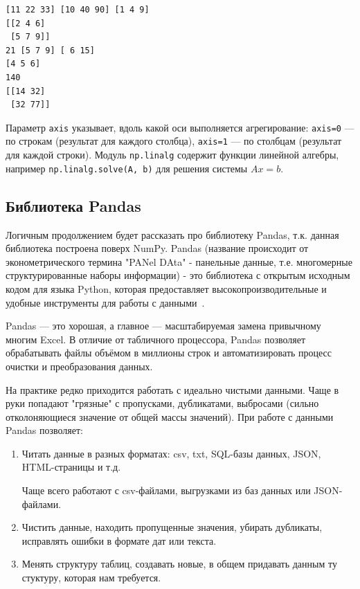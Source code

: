 \documentclass[pract]{SCWorks}
\begin{document}
\begin{verbatim}
[11 22 33] [10 40 90] [1 4 9]
[[2 4 6]
 [5 7 9]]
21 [5 7 9] [ 6 15]
[4 5 6]
140
[[14 32]
 [32 77]]
\end{verbatim}

Параметр \texttt{axis} указывает, вдоль какой оси выполняется агрегирование: \texttt{axis=0} --- по строкам
(результат для каждого столбца), \texttt{axis=1} --- по столбцам (результат для каждой строки).
Модуль \texttt{np.linalg} содержит функции линейной алгебры, например \texttt{np.linalg.solve(A, b)} для решения
системы \(Ax = b\).

\subsection{Библиотека Pandas}

Логичным продолжением будет рассказать про библиотеку Pandas, т.к. данная библиотека построена поверх NumPy. 
Pandas (название происходит от эконометрического термина "PANel DAta" - панельные данные, т.е. многомерные 
структурированные наборы информации) - это библиотека с открытым исходным кодом для языка Python, 
которая предоставляет высокопроизводительные и удобные инструменты для работы с данными~\cite{pandas-docs,mckinney}. 

Pandas — это хорошая, а главное — масштабируемая замена привычному многим Excel. В отличие от табличного 
процессора, Pandas позволяет обрабатывать файлы объёмом в миллионы строк и автоматизировать процесс 
очистки и преобразования данных.

На практике редко приходится работать с идеально чистыми данными. Чаще в руки попадают "грязные" с 
пропусками, дубликатами, выбросами (сильно отколоняющиеся значение от общей массы значений).
При работе с данными Pandas позволяет:

\begin{enumerate}
    \item Читать данные в разных форматах: csv, txt, SQL-базы данных, JSON, HTML-страницы и т.д.
    
    Чаще всего работают с csv-файлами, выгрузками из баз данных или JSON-файлами.
    \item Чистить данные, находить пропущенные значения, убирать дубликаты, исправлять ошибки в формате дат или текста.
    \item Менять структуру таблиц, создавать новые, в общем придавать данным ту стуктуру, которая нам требуется. 
\end{enumerate}
\end{document}
